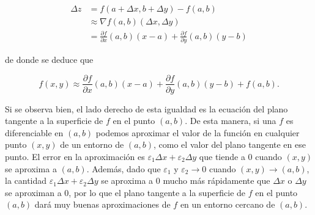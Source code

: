 \documentclass[
  a4paper,
]{scrreport}
\theoremstyle{plain}
\theoremstyle{plain}
\theoremstyle{definition}
\theoremstyle{definition}
\theoremstyle{plain}
\theoremstyle{definition}
\theoremstyle{remark}
\begin{document}
\begin{align*}
\Delta z 
&= f(a+\Delta x, b+\Delta y) - f(a,b) \\
&\approx \nabla f(a, b) (\Delta x, \Delta y) \\
&= \frac{\partial f}{\partial x}(a,b)(x-a) + \frac{\partial f}{\partial y}(a,b)(y-b)
\end{align*}

de donde se deduce que

\[
f(x, y) \approx \frac{\partial f}{\partial x}(a,b)(x-a) + \frac{\partial f}{\partial y}(a,b)(y-b) + f(a,b).
\]

Si se observa bien, el lado derecho de esta igualdad es la ecuación del
plano tangente a la superficie de \(f\) en el punto \((a,b)\). De esta
manera, si una \(f\) es diferenciable en \((a,b)\) podemos aproximar el
valor de la función en cualquier punto \((x,y)\) de un entorno de
\((a,b)\), como el valor del plano tangente en ese punto. El error en la
aproximación es \(\varepsilon_1 \Delta x + \varepsilon_2 \Delta y\) que
tiende a \(0\) cuando \((x,y)\) se aproxima a \((a,b)\). Además, dado
que \(\varepsilon_1\) y \(\varepsilon_2 \to 0\) cuando
\((x,y)\to (a,b)\), la cantidad
\(\varepsilon_1 \Delta x + \varepsilon_2 \Delta y\) se aproxima a \(0\)
mucho más rápidamente que \(\Delta x\) o \(\Delta y\) se aproximan a
\(0\), por lo que el plano tangente a la superficie de \(f\) en el punto
\((a,b)\) dará muy buenas aproximaciones de \(f\) en un entorno cercano
de \((a,b)\).
\end{document}
